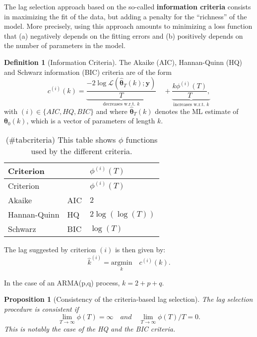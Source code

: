\documentclass[
  12pt,
]{book}
\newtheorem{proposition}{Proposition}[chapter]
\theoremstyle{definition}
\newtheorem{definition}{Definition}[chapter]
\theoremstyle{definition}
\theoremstyle{definition}
\theoremstyle{definition}
\theoremstyle{remark}
\begin{document}
The lag selection approach based on the so-called \textbf{information criteria} consists in maximizing the fit of the data, but adding a penalty for the ``richness'' of the model. More precisely, using this approach amounts to minimizing a loss function that (a) negatively depends on the fitting errors and (b) positively depends on the number of parameters in the model.

\begin{definition}[Information Criteria]
\protect\hypertarget{def:infocriteria}{}\label{def:infocriteria}The Akaike (AIC), Hannan-Quinn (HQ) and Schwarz information (BIC) criteria are of the form
\[
c^{(i)}(k) = \underbrace{\frac{- 2 \log \mathcal{L}(\hat{\boldsymbol\theta}_T(k);\mathbf{y})}{T}}_{\mbox{decreases w.r.t. $k$}} \quad +
\underbrace{
\frac{k\phi^{(i)}(T)}{T},}_{\mbox{increases w.r.t. $k$}}
\]
with \((i) \in\{AIC,HQ,BIC\}\) and where \(\hat{\boldsymbol\theta}_T(k)\) denotes the ML estimate of \(\boldsymbol\theta_0(k)\), which is a vector of parameters of length \(k\).

\begin{longtable}[]{@{}lll@{}}
\caption{(\#tabcriteria) This table shows \(\phi\) functions used by the different criteria.}\tabularnewline
\toprule()
Criterion & & \(\phi^{(i)}(T)\) \\
\midrule()
\endfirsthead
\toprule()
Criterion & & \(\phi^{(i)}(T)\) \\
\midrule()
\endhead
Akaike & AIC & \(2\) \\
Hannan-Quinn & HQ & \(2\log(\log(T))\) \\
Schwarz & BIC & \(\log(T)\) \\
\bottomrule()
\end{longtable}

The lag suggested by criterion \((i)\) is then given by:
\[
\boxed{\hat{k}^{(i)} = \underset{k}{\mbox{argmin}} \quad c^{(i)}(k).}
\]
\end{definition}

In the case of an ARMA(p,q) process, \(k=2+p+q\).

\begin{proposition}[Consistency of the criteria-based lag selection]
\protect\hypertarget{prp:infocriteria}{}\label{prp:infocriteria}The lag selection procedure is consistent if
\[
\lim_{T \rightarrow \infty} \phi(T) = \infty \quad and \quad \lim_{T \rightarrow \infty} \phi(T)/T = 0.
\]
This is notably the case of the HQ and the BIC criteria.
\end{proposition}
\end{document}
